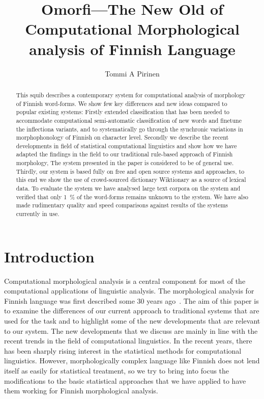 \documentclass[a4paper,12pt]{article}
\title{Omorfi---The New Old of Computational Morphological analysis of Finnish
Language}
\author{Tommi A Pirinen}
\begin{document}
\maketitle

\begin{abstract}

    This squib describes a contemporary system for computational analysis of
    morphology of Finnish word-forms. We show few key differences and new
    ideas compared to popular existing systems: Firstly extended classification
    that has been needed to
    accommodate computational semi-automatic classification of new words and
    finetune the inflectiona variants, and to systematically go through the
    synchronic variations in morphophonology of Finnish on character level.
    Secondly we describe the recent developments in field of statistical
    computational linguistics and show how we have adapted the findings in
    the field to our traditional rule-based approach of Finnish morphology,
    The system presented in the paper is considered to be of general use. 
    Thirdly, our system is based fully on free and open source systems and
    approaches, to this end we show the use of crowd-sourced dictionary 
    Wiktionary as a source of lexical data. To
    evaluate the system we have analysed large text corpora on the system
    and verified that only 1~\% of the word-forms remains unknown to the system.
    We have also made rudimentary quality and speed 
    comparisons against results of the systems currently in use.

\end{abstract}

\section{Introduction}

Computational morphological analysis is a central component for most of the
computational applications of linguistic analysis. The morphological analysis
for Finnish language was first described some 30 years ago~\cite{}. The
aim of this paper is to examine the differences of our current approach to
traditional systems that are used for the task and to highlight some of the new
developments that are relevant to our system. The new developments that we
discuss are mainly in line with the recent trends in the field of computational
linguistics. In the recent years, there has been sharply rising interest in the
statistical methods for computational linguistics. However, morphologically
complex language like Finnish does not lend itself as easily for statistical
treatment, so we try to bring into focus the modifications to the basic
statistical approaches that we have applied to have them working for Finnish
morphological analysis. 
\end{document}

